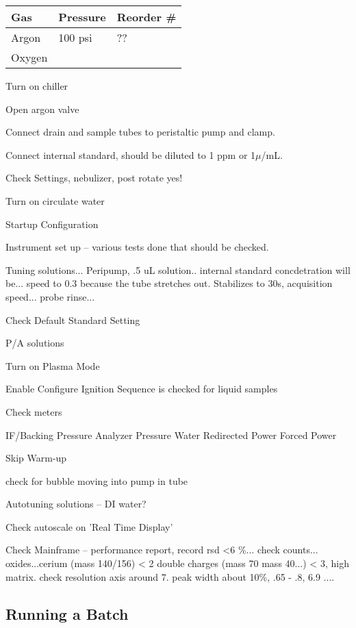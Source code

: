 \documentclass[12pt]{../SOP4_alpha}\usepackage[]{graphicx}\usepackage[]{color}
\begin{document}
\begin{table}[h]
\begin{tabular}{lll} \hline
Gas   &     Pressure    & Reorder \# \\ \hline\hline
Argon &       100 psi   & ??          \\
Oxygen&                 & \\ \hline

\end{tabular}
\end{table}

\NP Turn on chiller

\NP Open argon valve

\NP Connect drain and sample tubes to peristaltic pump and clamp.

\NP Connect internal standard, should be diluted to 1 ppm or 1$\mu$/mL.

\NP Check Settings, nebulizer, post rotate yes!

\NP Turn on circulate water

\NP Startup Configuration

\NP Instrument set up -- various tests done that should be checked.

\NP Tuning solutions... Peripump, .5 uL solution.. internal standard concdetration will be...  speed to 0.3 because the tube stretches out. Stabilizes to 30s, acquisition speed... probe rinse... 

\NP Check Default Standard Setting

\NP P/A solutions

\NP Turn on Plasma Mode 

\NP Enable Configure Ignition Sequence is checked for liquid samples

\NP Check meters 

IF/Backing Pressure
Analyzer Pressure
Water
Redirected Power
Forced Power


\NP Skip Warm-up

\NP check for bubble moving into pump in tube

\NP Autotuning solutions -- DI water?

\NP Check autoscale on 'Real Time Display'

\NP Check Mainframe -- performance report, record rsd <6 \%... check counts... oxides...cerium (mass 140/156) < 2 double charges (mass 70 mass 40...) < 3, high matrix.  check resolution axis around 7. peak width about 10\%, .65 - .8, 6.9 ....


\subsection{Running a Batch}
\end{document}
